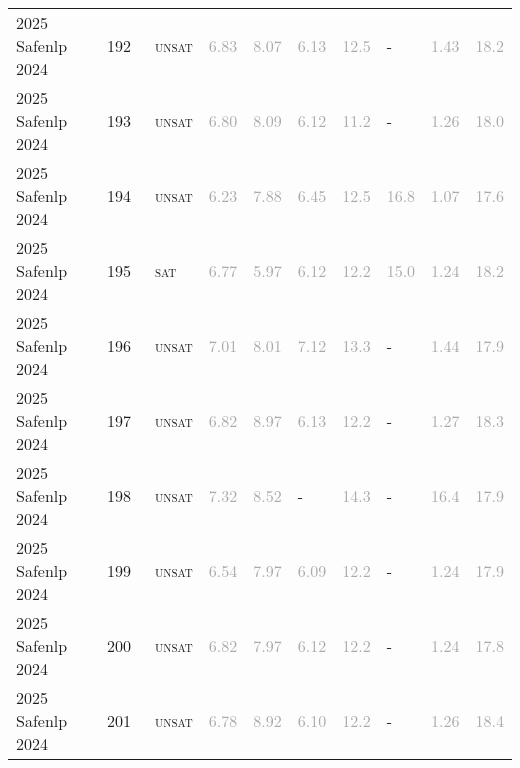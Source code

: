 \begin{center}
{\begin{longtable}{@{}llllllllll@{}}
2025 Safenlp 2024 & 192 & ~\textsc{unsat} & \textcolor{darkgray}{6.83} & \textcolor{darkgray}{8.07} & \textcolor{darkgray}{6.13} & \textcolor{darkgray}{12.5} & - & \textcolor{darkgray}{1.43} & \textcolor{darkgray}{18.2} \\
2025 Safenlp 2024 & 193 & ~\textsc{unsat} & \textcolor{darkgray}{6.80} & \textcolor{darkgray}{8.09} & \textcolor{darkgray}{6.12} & \textcolor{darkgray}{11.2} & - & \textcolor{darkgray}{1.26} & \textcolor{darkgray}{18.0} \\
2025 Safenlp 2024 & 194 & ~\textsc{unsat} & \textcolor{darkgray}{6.23} & \textcolor{darkgray}{7.88} & \textcolor{darkgray}{6.45} & \textcolor{darkgray}{12.5} & \textcolor{darkgray}{16.8} & \textcolor{darkgray}{1.07} & \textcolor{darkgray}{17.6} \\
2025 Safenlp 2024 & 195 & ~\textsc{sat} & \textcolor{darkgray}{6.77} & \textcolor{darkgray}{5.97} & \textcolor{darkgray}{6.12} & \textcolor{darkgray}{12.2} & \textcolor{darkgray}{15.0} & \textcolor{darkgray}{1.24} & \textcolor{darkgray}{18.2} \\
2025 Safenlp 2024 & 196 & ~\textsc{unsat} & \textcolor{darkgray}{7.01} & \textcolor{darkgray}{8.01} & \textcolor{darkgray}{7.12} & \textcolor{darkgray}{13.3} & - & \textcolor{darkgray}{1.44} & \textcolor{darkgray}{17.9} \\
2025 Safenlp 2024 & 197 & ~\textsc{unsat} & \textcolor{darkgray}{6.82} & \textcolor{darkgray}{8.97} & \textcolor{darkgray}{6.13} & \textcolor{darkgray}{12.2} & - & \textcolor{darkgray}{1.27} & \textcolor{darkgray}{18.3} \\
2025 Safenlp 2024 & 198 & ~\textsc{unsat} & \textcolor{darkgray}{7.32} & \textcolor{darkgray}{8.52} & - & \textcolor{darkgray}{14.3} & - & \textcolor{darkgray}{16.4} & \textcolor{darkgray}{17.9} \\
2025 Safenlp 2024 & 199 & ~\textsc{unsat} & \textcolor{darkgray}{6.54} & \textcolor{darkgray}{7.97} & \textcolor{darkgray}{6.09} & \textcolor{darkgray}{12.2} & - & \textcolor{darkgray}{1.24} & \textcolor{darkgray}{17.9} \\
2025 Safenlp 2024 & 200 & ~\textsc{unsat} & \textcolor{darkgray}{6.82} & \textcolor{darkgray}{7.97} & \textcolor{darkgray}{6.12} & \textcolor{darkgray}{12.2} & - & \textcolor{darkgray}{1.24} & \textcolor{darkgray}{17.8} \\
2025 Safenlp 2024 & 201 & ~\textsc{unsat} & \textcolor{darkgray}{6.78} & \textcolor{darkgray}{8.92} & \textcolor{darkgray}{6.10} & \textcolor{darkgray}{12.2} & - & \textcolor{darkgray}{1.26} & \textcolor{darkgray}{18.4} \\

\end{longtable}}
\end{center}
